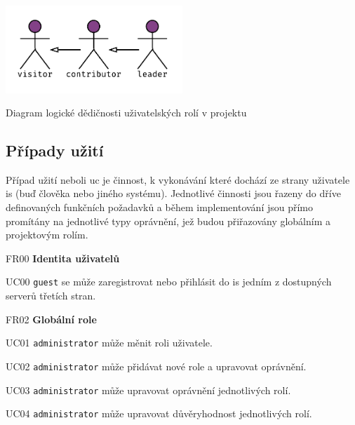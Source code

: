 \begin{fig:illustration}
   \includegraphics[width=0.5\textwidth]{images/dia-actors-project.pdf}
   \caption{Diagram logické dědičnosti uživatelských rolí v projektu}\label{pic:dia-actors-project}
\end{fig:illustration}



\subsection{Případy užití}

Případ užití neboli \gls{uc} je činnost, k vykonávání které dochází ze strany uživatele \gls{is} (buď člověka nebo jiného systému). Jednotlivé činnosti jsou řazeny do dříve definovaných funkčních požadavků a během implementování jsou přímo promítány na jednotlivé typy oprávnění, jež budou přiřazovány globálním a projektovým rolím.


\begin{dlnar}
   \item[FR00] \textbf{Identita uživatelů}

   \begin{dlnar}
      \item[UC00]
      \texttt{guest} se může zaregistrovat nebo přihlásit do \gls{is} jedním z dostupných serverů třetích stran.
   \end{dlnar}
\end{dlnar}



\begin{dlnar}
   \item[FR02] \textbf{Globální role}

   \begin{dlnar}
      \item[UC01] 
      \texttt{administrator} může měnit roli uživatele. 

      \item[UC02] 
      \texttt{administrator} může přidávat nové role a upravovat oprávnění. 

      \item[UC03]
      \texttt{administrator} může upravovat oprávnění jednotlivých rolí.

      \item[UC04] 
      \texttt{administrator} může upravovat důvěryhodnost jednotlivých rolí.
   \end{dlnar}
\end{dlnar}


